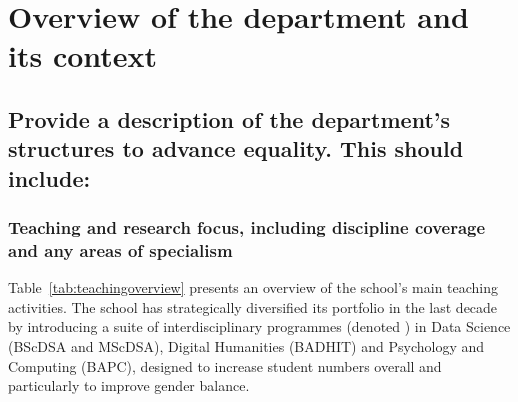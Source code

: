 %
%



\section{Overview of the department and its context}
\label{sec:overview}




\subsection{Provide a description of the department's structures to advance equality. This should include:}  

\subsubsection{Teaching and research focus, including discipline coverage and any areas of specialism}



Table~\ref{tab:teachingoverview} presents an overview of the school's
main teaching activities. 
The school has strategically diversified its portfolio in the
last decade by introducing a suite of interdisciplinary programmes
(denoted \interdis)
in Data Science (BScDSA and MScDSA), Digital Humanities (BADHIT) and Psychology and Computing (BAPC), designed to increase 
student  numbers overall and  particularly to improve gender balance. 


